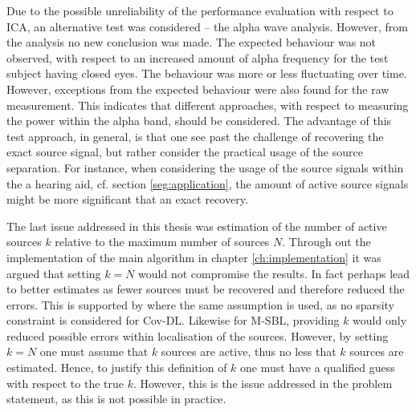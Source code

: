 Due to the possible unreliability of the performance evaluation with respect to ICA, an alternative test was considered -- the alpha wave analysis. 
However, from the analysis no new conclusion was made. The expected behaviour was not observed, with respect to an increased amount of alpha frequency for the test subject having closed eyes. 
The behaviour was more or less fluctuating over time. However, exceptions from the expected behaviour were also found for the raw measurement. This indicates that different approaches, with respect to measuring the power within the alpha band, should be considered.
The advantage of this test approach, in general, is that one see past the challenge of recovering the exact source signal, but rather consider the practical usage of the source separation. For instance, when considering the usage of the source signals within the a hearing aid, cf. section \ref{seg:application}, the amount of active source signals might be more significant that an exact recovery.         

The last issue addressed in this thesis was estimation of the number of active sources $k$ relative to the maximum number of sources $N$. Through out the implementation of the main algorithm in chapter \ref{ch:implementation} it was argued that setting $k = N$ would not compromise the results. 
In fact perhaps lead to better estimates as fewer sources must be recovered and therefore reduced the errors.
This is supported by \cite{Balkan2015} where the same assumption is used, as no sparsity constraint is considered for Cov-DL. 
Likewise for M-SBL, providing $k$ would only reduced possible errors within localisation of the sources.
However, by setting $k = N$ one must assume that $k$ sources are active, thus no less that $k$ sources are estimated. 
Hence, to justify this definition of $k$ one must have a qualified guess with respect to the true $k$. 
However, this is the issue addressed in the problem statement, as this is not possible in practice.    


